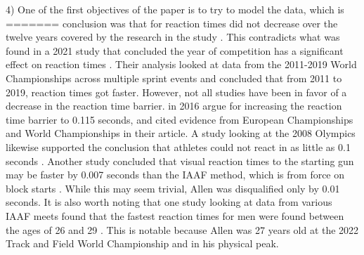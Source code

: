 \documentclass[12pt, letterpaper, titlepage]{article}
\begin{document}
4)
One of the first objectives of the paper is to try to model the data, which is
=======
conclusion was that for reaction times did not decrease over the twelve years
covered by the research in the study \citep{pilianidis2012start}.  This contradicts
what was found in a 2021 study that concluded the year of competition has a
significant effect on reaction times \citep{zhang2021correlation}.  Their
analysis looked at data from the 2011-2019 World Championships across multiple
sprint events and concluded that from 2011 to 2019, reaction times got
faster. However, not  all studies have been in favor of a decrease in the
reaction time barrier. \citet*{brosnan2017effects} in 2016 argue for increasing 
the reaction time barrier to 0.115 seconds, and cited evidence from European 
Championships and World Championships in their article.  A study looking 
at the 2008 Olympics likewise supported the conclusion that athletes could not
react in as little as 0.1 seconds \citep{lipps2011implications}.  Another study
concluded that visual reaction times to the starting gun may be faster by 0.007
seconds than the IAAF method, which is from force on block starts 
\citep{holmes2018method}.  While this may seem trivial, Allen was disqualified
only by 0.01 seconds. It is also worth noting that one study looking at data 
from various IAAF meets found that the fastest reaction times for men were found
between the ages of 26 and 29 \citep{tonnessen2013reaction}.  This is notable 
because Allen was 27 years old at the 2022 Track and Field World Championship 
and in his physical peak.
\end{document}
